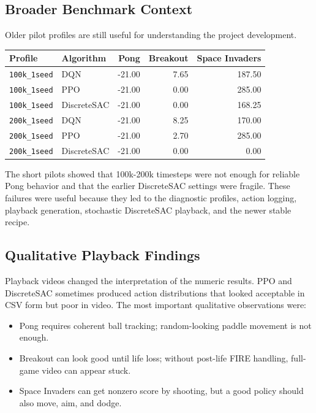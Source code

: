 \documentclass[11pt]{article}
\begin{document}
\subsection*{Broader Benchmark Context}

Older pilot profiles are still useful for understanding the project development.

\begin{longtable}{L{0.22\textwidth} L{0.20\textwidth} r r r}
\toprule
Profile & Algorithm & Pong & Breakout & Space Invaders \\
\midrule
\endhead
\texttt{100k\_1seed} & DQN & -21.00 & 7.65 & 187.50 \\
\texttt{100k\_1seed} & PPO & -21.00 & 0.00 & 285.00 \\
\texttt{100k\_1seed} & DiscreteSAC & -21.00 & 0.00 & 168.25 \\
\texttt{200k\_1seed} & DQN & -21.00 & 8.25 & 170.00 \\
\texttt{200k\_1seed} & PPO & -21.00 & 2.70 & 285.00 \\
\texttt{200k\_1seed} & DiscreteSAC & -21.00 & 0.00 & 0.00 \\
\bottomrule
\end{longtable}

The short pilots showed that 100k-200k timesteps were not enough for reliable Pong behavior and that the earlier DiscreteSAC settings were fragile. These failures were useful because they led to the diagnostic profiles, action logging, playback generation, stochastic DiscreteSAC playback, and the newer stable recipe.

\subsection*{Qualitative Playback Findings}

Playback videos changed the interpretation of the numeric results. PPO and DiscreteSAC sometimes produced action distributions that looked acceptable in CSV form but poor in video. The most important qualitative observations were:

\begin{itemize}
\item Pong requires coherent ball tracking; random-looking paddle movement is not enough.
\item Breakout can look good until life loss; without post-life FIRE handling, full-game video can appear stuck.
\item Space Invaders can get nonzero score by shooting, but a good policy should also move, aim, and dodge.
\end{itemize}
\end{document}
